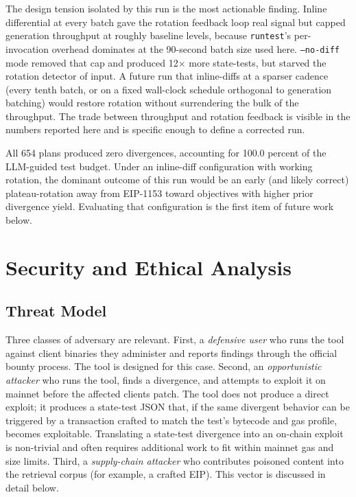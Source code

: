 \documentclass[conference]{IEEEtran}
\begin{document}
The design tension isolated by this run is the most actionable finding. Inline differential at every batch gave the rotation feedback loop real signal but capped generation throughput at roughly baseline levels, because \texttt{runtest}'s per-invocation overhead dominates at the 90-second batch size used here. \texttt{--no-diff} mode removed that cap and produced 12$\times$ more state-tests, but starved the rotation detector of input. A future run that inline-diffs at a sparser cadence (every tenth batch, or on a fixed wall-clock schedule orthogonal to generation batching) would restore rotation without surrendering the bulk of the throughput. The trade between throughput and rotation feedback is visible in the numbers reported here and is specific enough to define a corrected run.

All 654 plans produced zero divergences, accounting for 100.0 percent of the LLM-guided test budget. Under an inline-diff configuration with working rotation, the dominant outcome of this run would be an early (and likely correct) plateau-rotation away from EIP-1153 toward objectives with higher prior divergence yield. Evaluating that configuration is the first item of future work below.

\section{Security and Ethical Analysis}

\subsection{Threat Model}

Three classes of adversary are relevant. First, a \emph{defensive user} who runs the tool against client binaries they administer and reports findings through the official bounty process. The tool is designed for this case. Second, an \emph{opportunistic attacker} who runs the tool, finds a divergence, and attempts to exploit it on mainnet before the affected clients patch. The tool does not produce a direct exploit; it produces a state-test JSON that, if the same divergent behavior can be triggered by a transaction crafted to match the test's bytecode and gas profile, becomes exploitable. Translating a state-test divergence into an on-chain exploit is non-trivial and often requires additional work to fit within mainnet gas and size limits. Third, a \emph{supply-chain attacker} who contributes poisoned content into the retrieval corpus (for example, a crafted EIP). This vector is discussed in detail below.
\end{document}
